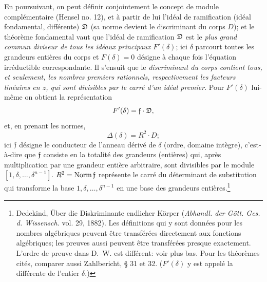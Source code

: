 En poursuivant, on peut définir conjointement le concept de module complémentaire (Hensel no. 12), et à partir de lui l'idéal de ramification (idéal fondamental, différente) \(\mathfrak D\) (sa norme devient le discriminant du corps \(D\)); et le théorème fondamental vaut que l'idéal de ramification \(\mathfrak D\) est le \emph{plus grand commun diviseur de tous les idéaux principaux \(F'(\delta)\)}; ici \(\delta\) parcourt toutes les grandeurs entières du corps et \(F(\delta)=0\) désigne à chaque fois l'équation irréductible correspondante. Il s'ensuit que le \emph{discriminant du corps contient tous, et seulement, les nombres premiers rationnels, respectivement les facteurs linéaires en \(z\), qui sont divisibles par le carré d'un idéal premier}. Pour \(F'(\delta)\) lui-même on obtient la représentation
\[
F'(\delta)=\mathfrak f\cdot\mathfrak D,
\]
et, en prenant les normes,
\[
\Delta(\delta)=R^2\cdot D;
\]
ici \(\mathfrak f\) désigne le conducteur de l'anneau dérivé de \(\delta\) (ordre, domaine intègre), c'est-à-dire que \(\mathfrak f\) consiste en la totalité des grandeurs (entières) qui, après multiplication par une grandeur entière arbitraire, sont divisibles par le module \([1,\delta,\ldots,\delta^{n-1}]\). \(R^2=\operatorname{Norm}\mathfrak f\) représente le carré du déterminant de substitution qui transforme la base \(1,\delta,\ldots,\delta^{n-1}\) en une base des grandeurs entières.\footnote{Dedekind, Über die Diskriminante endlicher Körper (\emph{Abhandl. der Gött. Ges. d. Wissensch.} vol. 29, 1882). Les définitions qui y sont données pour les nombres algébriques peuvent être transférées directement aux fonctions algébriques; les preuves aussi peuvent être transférées presque exactement. L'ordre de preuve dans D.--W. est différent: voir plus bas. Pour les théorèmes cités, comparer aussi Zahlbericht, \S{} 31 et 32. (\(F'(\delta)\) y est appelé la \og{}différente\fg{} de l'entier \(\delta\).)}

